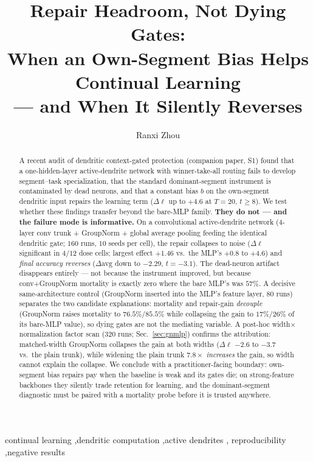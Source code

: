 \documentclass[review]{elsarticle}
\begin{document}
\begin{frontmatter}

\title{Repair Headroom, Not Dying Gates:\\
When an Own-Segment Bias Helps Continual Learning\\
--- and When It Silently Reverses}

\author[inst1]{Ranxi Zhou}

\begin{abstract}
A recent audit of dendritic context-gated protection (companion paper,
S1) found that a one-hidden-layer active-dendrite network with
winner-take-all routing fails to develop segment--task specialization,
that the standard dominant-segment instrument is contaminated by dead
neurons, and that a constant bias $b$ on the own-segment dendritic
input repairs the learning term ($\Delta\ell$ up to $+4.6$ at
$T{=}20$, $t \ge 8$). We test whether these findings transfer beyond
the bare-MLP family. \textbf{They do not --- and the failure mode is
informative.} On a convolutional active-dendrite network
(4-layer conv trunk + GroupNorm + global average pooling feeding the
identical dendritic gate; $160$ runs, $10$ seeds per cell), the
repair collapses to noise ($\Delta\ell$ significant in $4/12$ dose
cells; largest effect $+1.46$ vs.\ the MLP's $+0.8$ to $+4.6$) and
\emph{final accuracy reverses} ($\Delta\mathrm{avg}$ down to $-2.29$,
$t{=}-3.1$). The dead-neuron artifact disappears entirely --- not
because the instrument improved, but because conv+GroupNorm mortality
is exactly zero where the bare MLP's was $57\%$. A decisive
same-architecture control (GroupNorm inserted into the MLP's feature
layer, $80$ runs) separates the two candidate
explanations: mortality and repair-gain \emph{decouple} (GroupNorm
raises mortality to $76.5\%$/$85.5\%$ while collapsing the gain to
$17\%$/$26\%$ of its bare-MLP value), so dying gates are not the
mediating variable. A post-hoc width$\times$normalization factor scan
($320$ runs; Sec.~\ref{sec:gnmlp}) confirms the attribution:
matched-width GroupNorm collapses the gain at both widths
($\Delta\ell$ $-2.6$ to $-3.7$ vs.\ the plain trunk), while widening
the plain trunk $7.8\times$ \emph{increases} the gain, so width cannot
explain the collapse. We conclude
with a practitioner-facing boundary: own-segment bias repairs pay
when the baseline is weak and its gates die; on strong-feature
backbones they silently trade retention for learning, and the
dominant-segment diagnostic must be paired with a mortality probe
before it is trusted anywhere.
\end{abstract}

\begin{keyword}
continual learning \sep dendritic computation \sep active dendrites \sep
reproducibility \sep negative results
\end{keyword}

\end{frontmatter}
\end{document}
